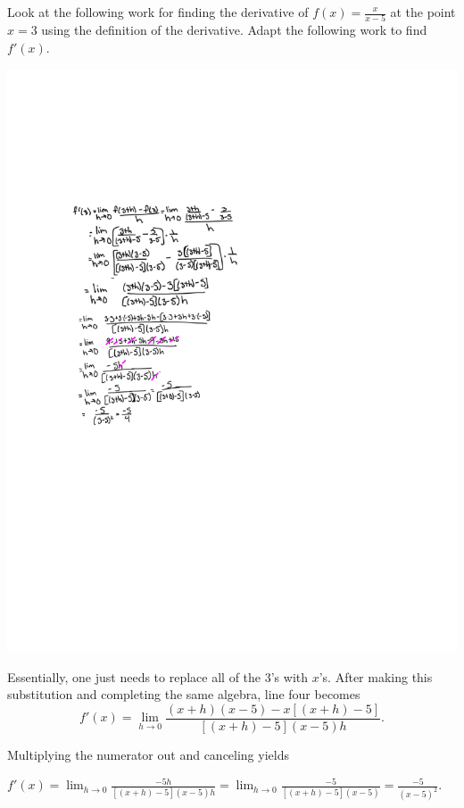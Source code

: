 \documentclass[nooutcomes]{ximera}
\begin{document}
\begin{problem}
Look at the following work for finding the derivative of $f(x) = \frac{x}{x-5}$ at the point $x=3$ using the definition of the derivative.  Adapt the following work to find $f'(x)$.  
	\begin{image}
	\includegraphics[trim= 170 310 250 180]{Figure1.pdf}
	\end{image}
			\begin{freeResponse}
			Essentially, one just needs to replace all of the $3$'s with $x$'s.  After making this substitution and completing the same algebra, line four becomes
			$$ f'(x) = \lim_{h \to 0} \frac{(x+h)(x-5) - x[(x+h)-5]}{[(x+h)-5](x-5)h}. $$
			
			Multiplying the numerator out and canceling yields
			
			$ f'(x) = \lim_{h \to 0} \frac{-5h}{[(x+h)-5](x-5)h} 
			= \lim_{h \to 0} \frac{-5}{[(x+h)-5](x-5)}
			= \frac{-5}{(x-5)^2}.$
			\end{freeResponse}
\end{problem}
	
\end{document}
